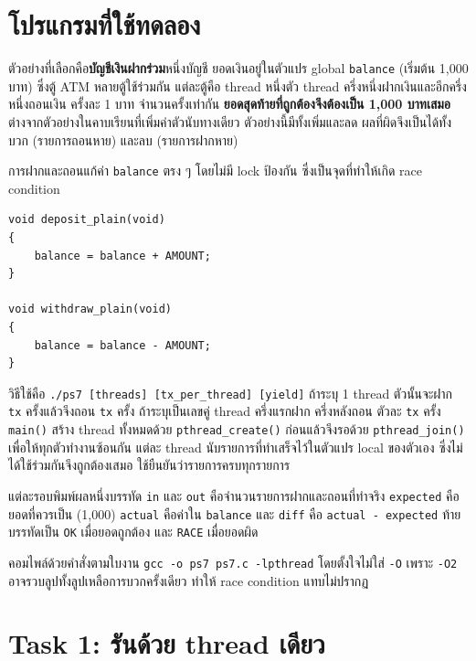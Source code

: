 \documentclass[a4paper,11pt]{article}
\newcommand{\code}[1]{\texttt{#1}}
\begin{document}
\section{โปรแกรมที่ใช้ทดลอง}

ตัวอย่างที่เลือกคือ\textbf{บัญชีเงินฝากร่วม}หนึ่งบัญชี ยอดเงินอยู่ในตัวแปร global \code{balance} (เริ่มต้น 1,000 บาท) ซึ่งตู้ ATM หลายตู้ใช้ร่วมกัน แต่ละตู้คือ thread หนึ่งตัว thread ครึ่งหนึ่งฝากเงินและอีกครึ่งหนึ่งถอนเงิน ครั้งละ 1 บาท จำนวนครั้งเท่ากัน \textbf{ยอดสุดท้ายที่ถูกต้องจึงต้องเป็น 1,000 บาทเสมอ} ต่างจากตัวอย่างในคาบเรียนที่เพิ่มค่าตัวนับทางเดียว ตัวอย่างนี้มีทั้งเพิ่มและลด ผลที่ผิดจึงเป็นได้ทั้งบวก (รายการถอนหาย) และลบ (รายการฝากหาย)

การฝากและถอนแก้ค่า \code{balance} ตรง ๆ โดยไม่มี lock ป้องกัน ซึ่งเป็นจุดที่ทำให้เกิด race condition

\begin{lstlisting}[caption={การฝากและถอนเงินที่ไม่มีการป้องกัน}]
void deposit_plain(void)
{
    balance = balance + AMOUNT;
}

void withdraw_plain(void)
{
    balance = balance - AMOUNT;
}
\end{lstlisting}

วิธีใช้คือ \code{./ps7 [threads] [tx\_per\_thread] [yield]} ถ้าระบุ 1 thread ตัวนั้นจะฝาก \code{tx} ครั้งแล้วจึงถอน \code{tx} ครั้ง ถ้าระบุเป็นเลขคู่ thread ครึ่งแรกฝาก ครึ่งหลังถอน ตัวละ \code{tx} ครั้ง \code{main()} สร้าง thread ทั้งหมดด้วย \code{pthread\_create()} ก่อนแล้วจึงรอด้วย \code{pthread\_join()} เพื่อให้ทุกตัวทำงานซ้อนกัน แต่ละ thread นับรายการที่ทำเสร็จไว้ในตัวแปร local ของตัวเอง ซึ่งไม่ได้ใช้ร่วมกันจึงถูกต้องเสมอ ใช้ยืนยันว่ารายการครบทุกรายการ

แต่ละรอบพิมพ์ผลหนึ่งบรรทัด \code{in} และ \code{out} คือจำนวนรายการฝากและถอนที่ทำจริง \code{expected} คือยอดที่ควรเป็น (1,000) \code{actual} คือค่าใน \code{balance} และ \code{diff} คือ \code{actual - expected} ท้ายบรรทัดเป็น \code{OK} เมื่อยอดถูกต้อง และ \code{RACE} เมื่อยอดผิด

คอมไพล์ด้วยคำสั่งตามใบงาน \code{gcc -o ps7 ps7.c -lpthread} โดยตั้งใจไม่ใส่ \code{-O} เพราะ \code{-O2} อาจรวบลูปทั้งลูปเหลือการบวกครั้งเดียว ทำให้ race condition แทบไม่ปรากฏ

\section{Task 1: รันด้วย thread เดียว}
\end{document}
